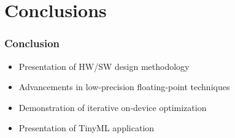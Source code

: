 \section{Conclusions}
\tableofcontents[currentsection]
\begin{frame}[c]
	\frametitle{Conclusion}
	
\begin{itemize}
	\item <1-> Presentation of HW/SW design methodology
	
	\vspace{1cm}
	
	\item<2-> Advancements in low-precision floating-point techniques
	
	\vspace{1cm}
	
	\item<3-> Demonstration of iterative on-device optimization
	
	\vspace{1cm}
	
	\item<4-> Presentation of TinyML application
\end{itemize}

\end{frame}